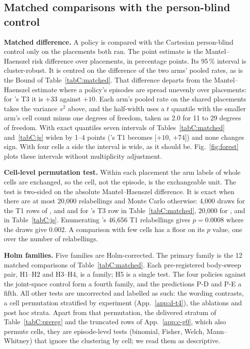 



\subsection{Matched comparisons with the person-blind control}
\label{app:c-matched}

\textbf{Matched difference.} A policy is compared with the Cartesian person-blind control only on the placements both
ran. The point estimate is the Mantel--Haenszel risk difference over placements, in percentage points. Its 95\,\%
interval is cluster-robust. It is centred on the difference of the two arms' pooled rates, as is the Bound of
Table~\ref{tabC:matched}. That difference departs from the Mantel--Haenszel estimate where a policy's episodes are
spread unevenly over placements: for \grd{}'s T3 it is $+33$ against $+10$. Each arm's pooled rate on the shared
placements takes the variance $s^2$ above, and the
half-width uses a $t$ quantile with the smaller arm's cell count minus one degrees of freedom, taken as 2.0 for 11 to
29 degrees of freedom. With exact quantiles seven intervals of Tables~\ref{tabC:matched} and~\ref{tabC:js} widen by
1--4 points (\pifast{}'s T1 becomes [$+10$, $+74$]) and none changes sign. With four cells a side
the interval is wide, as it should be. Fig.~\ref{fig:forest} plots these intervals without multiplicity adjustment.

\textbf{Cell-level permutation test.} Within each placement the arm labels of whole cells are exchanged, so the cell,
not the episode, is the exchangeable unit. The test is two-sided on the absolute Mantel--Haenszel difference. It is
exact when there are at most 20{,}000 relabellings and Monte Carlo otherwise: 4{,}000 draws for the T1 rows of
\pifive{}, \pizero{} and \pifast{} and for \pifive{}'s T3 row in Table~\ref{tabC:matched}, 20{,}000 for \pifive{},
\pizero{} and \pifast{} in Table~\ref{tabC:js}. Enumerating \pifast{}'s 46{,}656 T1 relabellings gives $p=0.0008$
where the draws give 0.002. A comparison with few cells has a floor on its $p$ value,
one over the number of relabellings.

\textbf{Holm families.} Five families are Holm-corrected. The primary family is the 12 matched comparisons of
Table~\ref{tabC:matched}. Each pre-registered body-sweep pair, H1--H2 and H3--H4, is a family; H5 is a single test. The
four policies against the joint-space control form a fourth family, and the predictions P-D and P-E a fifth. All other
tests are uncorrected and labelled as such: the wording contrasts, a cell permutation stratified by experiment
(App.~\ref{app:d-t4}), the ablations and post hoc strata. Apart from that permutation, the delivered stratum of
Table~\ref{tabC:prereg} and the truncated rows of App.~\ref{app:c-g0}, which also permute cells, they are episode-level tests
(binomial, Fisher, Welch, Mann--Whitney) that ignore the clustering by cell; we read them as descriptive.

